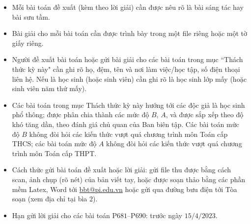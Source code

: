 \thispagestyle{thachthuctoanhocnone}
\pagestyle{thachthuctoanhoc}
\everymath{\color{thachthuctoanhoc}}
\graphicspath{{../thachthuctoanhoc/pic/}}
\begingroup
{}
\centering
\vspace*{4cm}
\endgroup
\vspace*{-8pt}
\begin{tBox}
	\begin{itemize}[leftmargin = 13pt, itemsep = 1.0pt] 
		\item Mỗi bài toán đề xuất (kèm theo lời giải) cần được nêu rõ là bài sáng tác hay bài sưu tầm.
		\item Bài giải cho mỗi bài toán cần được trình bày trong một file riêng hoặc
		một tờ giấy riêng.
		\item  Người đề xuất bài toán hoặc gửi bài giải cho các bài toán trong mục ``Thách thức kỳ này" cần ghi rõ họ, đệm, tên và nơi làm việc/học tập, số điện thoại liên hệ. Nếu là học sinh (hoặc sinh viên) cần ghi rõ là học sinh lớp mấy (hoặc sinh viên năm thứ mấy).
		\item Các bài toán trong mục Thách thức kỳ này hướng tới các độc giả là học sinh phổ thông; được phân chia thành các mức độ $B$, $A$, và được sắp xếp theo độ khó tăng dần, theo đánh giá chủ quan của Ban biên tập. Các bài toán mức độ $B$ không đòi hỏi các kiến thức vượt quá chương trình môn Toán cấp THCS; các bài toán mức độ $A$ không đòi hỏi các kiến thức vượt quá chương trình môn Toán cấp THPT.
		\item Cách thức gửi bài toán đề xuất hoặc lời giải: gửi file thu được bằng cách scan, ảnh chụp (rõ nét) của bản viết tay, hoặc được soạn thảo bằng các phần mềm Latex, Word tới \url{bbt@pi.edu.vn} hoặc gửi qua đường bưu điện tới Tòa soạn (xem địa chỉ tại bìa $2$).
		\item Hạn gửi lời giải cho các bài toán P$681$--P$690$: trước ngày $15/4/2023$.
	\end{itemize}
\end{tBox}
